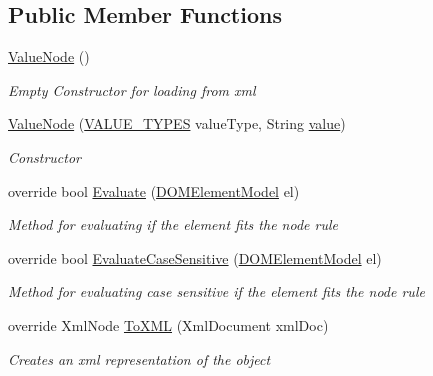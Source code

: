 \subsection*{Public Member Functions}
\begin{DoxyCompactItemize}
\item 
\hyperlink{class_web_analyzer_1_1_models_1_1_settings_model_1_1_expression_tree_1_1_value_node_afafaa57c7b7f5cdc5447139118bd6d47}{Value\+Node} ()
\begin{DoxyCompactList}\small\item\em Empty Constructor for loading from xml \end{DoxyCompactList}\item 
\hyperlink{class_web_analyzer_1_1_models_1_1_settings_model_1_1_expression_tree_1_1_value_node_a62cfbb11d38c3f17e240cb2c5a1ac6f1}{Value\+Node} (\hyperlink{class_web_analyzer_1_1_models_1_1_settings_model_1_1_expression_tree_1_1_value_node_ac18254d82bd6e0d754ed1a2484882d11}{V\+A\+L\+U\+E\+\_\+\+T\+Y\+P\+E\+S} value\+Type, String \hyperlink{_u_i_2_h_t_m_l_resources_2js_2lib_2underscore_8min_8js_af7e1471ab89699458c4df8bb657298f6}{value})
\begin{DoxyCompactList}\small\item\em Constructor \end{DoxyCompactList}\item 
override bool \hyperlink{class_web_analyzer_1_1_models_1_1_settings_model_1_1_expression_tree_1_1_value_node_a4372873a2359e8ef131624bad5bbaa58}{Evaluate} (\hyperlink{class_web_analyzer_1_1_models_1_1_data_model_1_1_d_o_m_element_model}{D\+O\+M\+Element\+Model} el)
\begin{DoxyCompactList}\small\item\em Method for evaluating if the element fits the node rule \end{DoxyCompactList}\item 
override bool \hyperlink{class_web_analyzer_1_1_models_1_1_settings_model_1_1_expression_tree_1_1_value_node_a79986418c7a3439d1cb5d8f14ded199e}{Evaluate\+Case\+Sensitive} (\hyperlink{class_web_analyzer_1_1_models_1_1_data_model_1_1_d_o_m_element_model}{D\+O\+M\+Element\+Model} el)
\begin{DoxyCompactList}\small\item\em Method for evaluating case sensitive if the element fits the node rule \end{DoxyCompactList}\item 
override Xml\+Node \hyperlink{class_web_analyzer_1_1_models_1_1_settings_model_1_1_expression_tree_1_1_value_node_a801c7d0fdc559f12d8c8e6ae1943b59d}{To\+X\+M\+L} (Xml\+Document xml\+Doc)
\begin{DoxyCompactList}\small\item\em Creates an xml representation of the object \end{DoxyCompactList}\end{DoxyCompactItemize}
